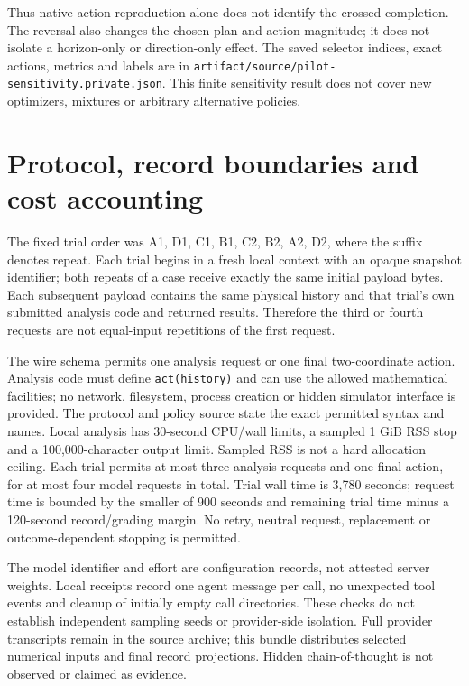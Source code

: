 Thus native-action reproduction alone does not identify the crossed
completion. The reversal also changes the chosen plan and action magnitude;
it does not isolate a horizon-only or direction-only effect. The saved
selector indices, exact actions, metrics and labels are in
\texttt{artifact/source/pilot-sensitivity.private.json}. This finite
sensitivity result does not cover new optimizers, mixtures or arbitrary
alternative policies.

\section{Protocol, record boundaries and cost accounting}
\label{app:protocol}
The fixed trial order was A1, D1, C1, B1, C2, B2, A2, D2, where the suffix denotes repeat. Each trial begins in a fresh local context with an opaque snapshot identifier; both repeats of a case receive exactly the same initial payload bytes. Each subsequent payload contains the same physical history and that trial's own submitted analysis code and returned results. Therefore the third or fourth requests are not equal-input repetitions of the first request.

The wire schema permits one analysis request or one final two-coordinate action. Analysis code must define \texttt{act(history)} and can use the allowed mathematical facilities; no network, filesystem, process creation or hidden simulator interface is provided. The protocol and policy source state the exact permitted syntax and names. Local analysis has 30-second CPU/wall limits, a sampled 1 GiB RSS stop and a 100,000-character output limit. Sampled RSS is not a hard allocation ceiling. Each trial permits at most three analysis requests and one final action, for at most four model requests in total. Trial wall time is 3,780 seconds; request time is bounded by the smaller of 900 seconds and remaining trial time minus a 120-second record/grading margin. No retry, neutral request, replacement or outcome-dependent stopping is permitted.

The model identifier and effort are configuration records, not attested server weights. Local receipts record one agent message per call, no unexpected tool events and cleanup of initially empty call directories. These checks do not establish independent sampling seeds or provider-side isolation. Full provider transcripts remain in the source archive; this bundle distributes selected numerical inputs and final record projections. Hidden chain-of-thought is not observed or claimed as evidence.

